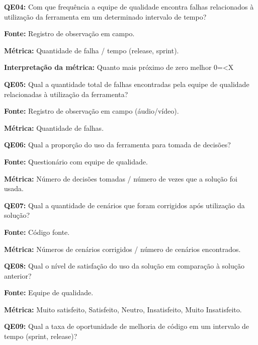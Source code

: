 
\textbf{QE04: } Com que frequência a equipe de qualidade encontra falhas relacionados à utilização da ferramenta em um determinado intervalo de tempo?

\textbf{Fonte:} Registro de observação em campo.

\textbf{Métrica:} Quantidade de falha / tempo (release, sprint).

\textbf{Interpretação da métrica:} Quanto mais próximo de zero melhor 0=<X \newline


\textbf{QE05: } Qual a quantidade total de falhas encontradas pela equipe de qualidade relacionadas à utilização da ferramenta?

\textbf{Fonte:} Registro de observação em campo (áudio/vídeo).

\textbf{Métrica:} Quantidade de falhas. \newline


\textbf{QE06: } Qual a proporção do uso da ferramenta para tomada de decisões?

\textbf{Fonte:} Questionário com equipe de qualidade.

\textbf{Métrica:} Número de decisões tomadas / número de vezes que a solução foi usada. \newline



\textbf{QE07: } Qual a quantidade de cenários que foram corrigidos após utilização da solução?

\textbf{Fonte:} Código fonte.

\textbf{Métrica:} Números de cenários corrigidos / número de cenários encontrados. \newline


\textbf{QE08: } Qual o nível de satisfação do uso da solução em comparação à solução anterior? 

\textbf{Fonte:} Equipe de qualidade.

\textbf{Métrica:} Muito satisfeito, Satisfeito, Neutro, Insatisfeito, Muito Insatisfeito. \newline


\textbf{QE09: } Qual a taxa de oportunidade de melhoria de código em um intervalo de tempo (sprint, release)? 

